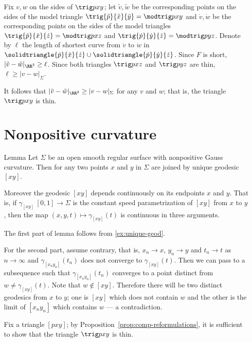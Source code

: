 Fix $v,w$ on the sides of $\trig p x y$;
let $\tilde v,\tilde w$ be the corresponding points on the sides of the model triangle $\trig {\tilde p}{\tilde x}{\tilde y}=\modtrig p x y$
and $\dot v,\dot w$ be the corresponding points on the sides of the model triangles $\trig {\dot p} {\dot x}{\dot z}=\modtrig p x z$ and $\trig {\dot p} {\dot y}{\dot z}=\modtrig p y z$.
Denote by $\ell$ the length of shortest curve from $\dot v$ to $\dot w$ in $\solidtriangle {\dot p}{\dot x}{\dot z}\cup \solidtriangle {\dot p} {\dot y} {\dot z}$.
Since $F$ is short, $|\tilde v-\tilde w|_{\RR^2}\ge \ell$.
Since both triangles $\trig p x z$ and $\trig p y z$ are thin, $\ell\ge|v-w|_{\Sigma}$.

It follows that $|\tilde v-\tilde w|_{\RR^2}\ge |v-w|_{\Sigma}$ for any $v$ and $w$;
that is, the triangle $\trig p x y$ is thin.
\qeds

\section{Nonpositive curvature}

\begin{thm}{Lemma}
Let $\Sigma$ be an open smooth regular surface with nonpositive Gauss curvature.
Then for any two points $x$ and $y$ in $\Sigma$ are joined by unique geodesic $[xy]$.

Moreover the geodesic $[xy]$ depends continuously on its endpoints $x$ and $y$. 
That is, if $\gamma_{[xy]}\:[0,1]\to \Sigma$ is the constant speed parametrization of $[xy]$ from $x$ to $y$,
then the map $(x,y,t)\mapsto \gamma_{[xy]}(t)$ is continuous in three arguments.
\end{thm}

The first part of lemma follows from \ref{ex:unique-geod}.

For the second part, assume contrary, that is, $x_n\to x$, $y_n\to y$ and $t_n\to t$ as $n\to \infty$ and 
$\gamma_{[x_ny_n]}(t_n)$ does not converge to $\gamma_{[xy]}(t)$. 
Then we can pass to a subsequence such that $\gamma_{[x_ny_n]}(t_n)$ converges to a point distinct from $w\ne \gamma_{[xy]}(t)$.
Note that $w\notin [xy]$. 
Therefore there will be two distinct geodesics from $x$ to $y$;
one is $[xy]$ which does not contain $w$ and the other is the limit of $[x_ny_n]$ which contains $w$ --- a contradiction.
\qeds

Fix a triangle $[p x y]$; 
by Proposition~\ref{prop:comp-reformulations}, it is sufficient to show that the triangle $\trig p x y$ is thin.   

